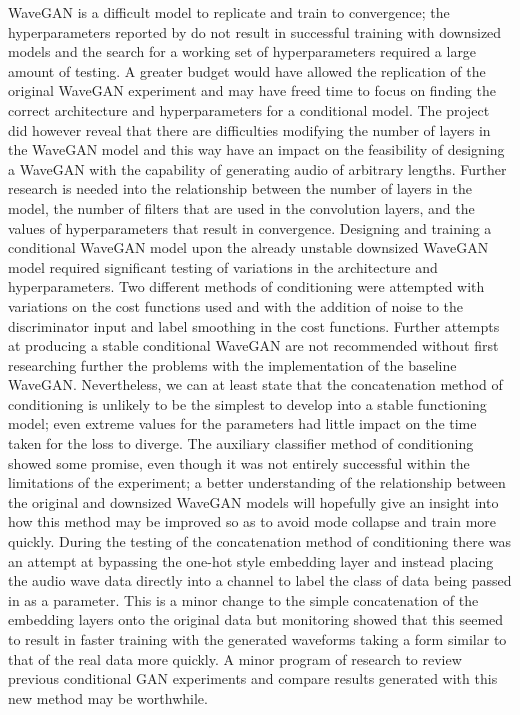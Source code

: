 \documentclass[a4paper, titlepage]{article}
\begin{document}
WaveGAN is a difficult model to replicate and train to convergence; the hyperparameters reported by \citeauthor{2018arXiv180204208D} do not result in successful training with downsized models and the search for a working set of hyperparameters required a large amount of testing.
A greater budget would have allowed the replication of the original WaveGAN experiment and may have freed time to focus on finding the correct architecture and hyperparameters for a conditional model.
\newline
\newline
The project did however reveal that there are difficulties modifying the number of layers in the WaveGAN model and this way have an impact on the feasibility of designing a WaveGAN with the capability of generating audio of arbitrary lengths.
Further research is needed into the relationship between the number of layers in the model, the number of filters that are used in the convolution layers, and the values of hyperparameters that result in convergence.
\newline
\newline
Designing and training a conditional WaveGAN model upon the already unstable downsized WaveGAN model required significant testing of variations in the architecture and hyperparameters.
Two different methods of conditioning were attempted with variations on the cost functions used and with the addition of noise to the discriminator input and label smoothing in the cost functions.
Further attempts at producing a stable conditional WaveGAN are not recommended without first researching further the problems with the implementation of the baseline WaveGAN. 
\newline
\newline
Nevertheless, we can at least state that the concatenation method of conditioning is unlikely to be the simplest to develop into a stable functioning model; even extreme values for the parameters had little impact on the time taken for the loss to diverge.
The auxiliary classifier method of conditioning showed some promise, even though it was not entirely successful within the limitations of the experiment; a better understanding of the relationship between the original and downsized WaveGAN models will hopefully give an insight into how this method may be improved so as to avoid mode collapse and train more quickly.
\newline
\newline
During the testing of the concatenation method of conditioning there was an attempt at bypassing the one-hot style embedding layer and instead placing the audio wave data directly into a channel to label the class of data being passed in as a parameter.
This is a minor change to the simple concatenation of the embedding layers onto the original data but monitoring showed that this seemed to result in faster training with the generated waveforms taking a form similar to that of the real data more quickly.
A minor program of research to review previous conditional \ac{GAN} experiments and compare results generated with this new method may be worthwhile.
\end{document}
